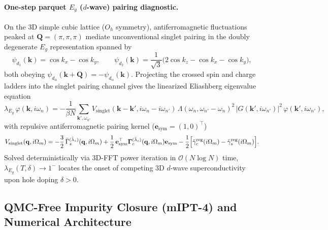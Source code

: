 \documentclass[11pt,a4paper]{article}
\numberwithin{equation}{section}
\theoremstyle{plain}
\theoremstyle{definition}
\providecommand{\vk}{\mathbf{k}}
\providecommand{\vq}{\mathbf{q}}
\providecommand{\vQ}{\mathbf{Q}}
\begin{document}
\paragraph{One-step parquet $E_g$ ($d$-wave) pairing diagnostic.}
On the 3D simple cubic lattice ($O_h$ symmetry), antiferromagnetic fluctuations peaked
at $\vQ = (\pi,\pi,\pi)$ mediate unconventional singlet pairing in the doubly
degenerate $E_g$ representation spanned by
\begin{equation}
    \psi_{d_1}(\vk) = \cos k_x - \cos k_y, \qquad
    \psi_{d_2}(\vk) = \frac{1}{\sqrt{3}}\bigl(2\cos k_z - \cos k_x - \cos k_y\bigr),
    \label{eq:Eg_basis}
\end{equation}
both obeying $\psi_{d_\alpha}(\vk+\vQ) = -\psi_{d_\alpha}(\vk)$. Projecting the
crossed spin and charge ladders into the singlet pairing channel gives the linearized
Eliashberg eigenvalue equation
\begin{equation}
    \lambda_{E_g}\,\varphi(\vk,i\omega_n)
    = -\frac{1}{\beta N} \sum_{\vk',\omega_{n'}}
      V_{\mathrm{singlet}}(\vk-\vk', i\omega_n - i\omega_{n'})\,
      \Lambda(\omega_n, \omega_{n'} - \omega_n)^2\,
      \bigl|G(\vk', i\omega_{n'})\bigr|^2\, \varphi(\vk', i\omega_{n'}),
    \label{eq:eliashberg_Eg}
\end{equation}
with repulsive antiferromagnetic pairing kernel ($\mathbf{e}_{\mathrm{sym}} = (1,0)^\top$)
\begin{equation}
    V_{\mathrm{singlet}}(\vq,i\Omega_m)
    = -\frac{3}{2}\,\bar{\Gamma}_s^{(\tilde{\lambda}_s)}(\vq,i\Omega_m)
      + \frac{1}{2}\,\mathbf{e}_{\mathrm{sym}}^\top \mathbf{\Gamma}_c^{(\tilde{\lambda}_c)}(\vq,i\Omega_m) \mathbf{e}_{\mathrm{sym}}
      - \frac{1}{2}\Bigl[\bar{\gamma}_c^{\mathrm{reg}}(i\Omega_m) - \bar{\gamma}_s^{\mathrm{reg}}(i\Omega_m)\Bigr].
    \label{eq:V_singlet}
\end{equation}
Solved deterministically via 3D-FFT power iteration in $\mathcal{O}(N\log N)$ time,
$\lambda_{E_g}(T,\delta) \to 1^-$ locates the onset of competing 3D $d$-wave
superconductivity upon hole doping $\delta > 0$.

\subsection{QMC-Free Impurity Closure (mIPT-4) and Numerical Architecture}
\label{sec:level23_imp}
\end{document}
